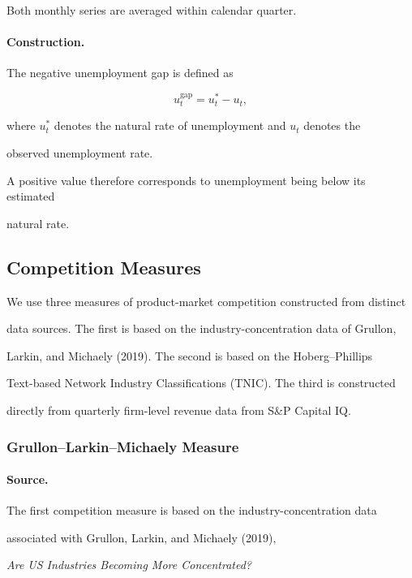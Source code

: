 \documentclass[11pt]{article}
\begin{document}
Both monthly series are averaged within calendar quarter.

\paragraph{Construction.}

The negative unemployment gap is defined as

\begin{equation}
u_t^{\mathrm{gap}}
=
u_t^{*}-u_t,
\end{equation}

where $u_t^{*}$ denotes the natural rate of unemployment and $u_t$ denotes the

observed unemployment rate.

A positive value therefore corresponds to unemployment being below its estimated

natural rate.



\subsection{Competition Measures}

We use three measures of product-market competition constructed from distinct

data sources. The first is based on the industry-concentration data of Grullon,

Larkin, and Michaely (2019). The second is based on the Hoberg--Phillips

Text-based Network Industry Classifications (TNIC). The third is constructed

directly from quarterly firm-level revenue data from S\&P Capital IQ.



\subsubsection{Grullon--Larkin--Michaely Measure}

\paragraph{Source.}

The first competition measure is based on the industry-concentration data

associated with Grullon, Larkin, and Michaely (2019),

\textit{Are US Industries Becoming More Concentrated?}
\end{document}
